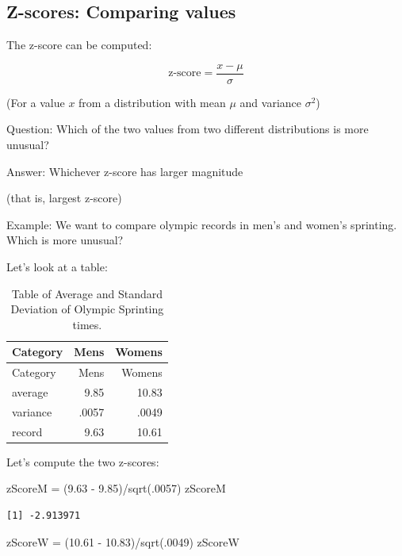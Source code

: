 \documentclass[
  letterpaper,
  DIV=11,
  numbers=noendperiod]{scrartcl}
\newenvironment{Shaded}{\begin{snugshade}}{\end{snugshade}}
\newcommand{\DecValTok}[1]{\textcolor[rgb]{0.68,0.00,0.00}{#1}}
\newcommand{\FloatTok}[1]{\textcolor[rgb]{0.68,0.00,0.00}{#1}}
\newcommand{\FunctionTok}[1]{\textcolor[rgb]{0.28,0.35,0.67}{#1}}
\newcommand{\NormalTok}[1]{\textcolor[rgb]{0.00,0.23,0.31}{#1}}
\newcommand{\OtherTok}[1]{\textcolor[rgb]{0.00,0.23,0.31}{#1}}
\newcommand{\SpecialCharTok}[1]{\textcolor[rgb]{0.37,0.37,0.37}{#1}}
\begin{document}
\subsection{Z-scores: Comparing values}\label{z-scores-comparing-values}

The {z-score} can be computed:

\[
\text{z-score} = \frac{x - \mu}{\sigma}
\]

{(For a value \(x\) from a distribution with mean \(\mu\) and variance
\(\sigma^2\))}

{Question:} Which of the two values from two different distributions is
more {unusual}?

{Answer:} Whichever z-score has larger {magnitude}

{(that is, largest \textbar z-score\textbar)}

{Example:} We want to compare olympic records in men's and women's
sprinting. Which is more unusual?

Let's look at a table:

\begin{longtable}[]{@{}lrr@{}}
\caption{Table of Average and Standard Deviation of Olympic Sprinting
times.}\tabularnewline
\toprule\noalign{}
Category & Mens & Womens \\
\midrule\noalign{}
\endfirsthead
\toprule\noalign{}
Category & Mens & Womens \\
\midrule\noalign{}
\endhead
\bottomrule\noalign{}
\endlastfoot
average & 9.85 & 10.83 \\
variance & .0057 & .0049 \\
record & 9.63 & 10.61 \\
\end{longtable}

Let's compute the two {z-scores}:

\begin{Shaded}
\begin{Highlighting}[]
\NormalTok{zScoreM }\OtherTok{=}\NormalTok{ (}\FloatTok{9.63} \SpecialCharTok{{-}} \FloatTok{9.85}\NormalTok{)}\SpecialCharTok{/}\FunctionTok{sqrt}\NormalTok{(.}\DecValTok{0057}\NormalTok{)}
\NormalTok{zScoreM}
\end{Highlighting}
\end{Shaded}

\begin{verbatim}
[1] -2.913971
\end{verbatim}

\begin{Shaded}
\begin{Highlighting}[]
\NormalTok{zScoreW }\OtherTok{=}\NormalTok{ (}\FloatTok{10.61} \SpecialCharTok{{-}} \FloatTok{10.83}\NormalTok{)}\SpecialCharTok{/}\FunctionTok{sqrt}\NormalTok{(.}\DecValTok{0049}\NormalTok{)}
\NormalTok{zScoreW}
\end{Highlighting}
\end{Shaded}
\end{document}
